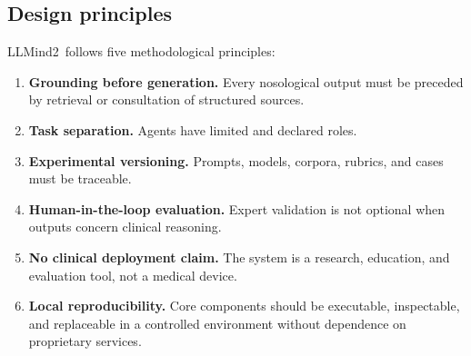 \documentclass[11pt,a4paper]{article}
\newcommand{\llmind}{LLMind2}
\begin{document}
\subsection{Design principles}
\llmind\ follows five methodological principles:
\begin{enumerate}
  \item \textbf{Grounding before generation.} Every nosological output must be preceded by retrieval or consultation of structured sources.
  \item \textbf{Task separation.} Agents have limited and declared roles.
  \item \textbf{Experimental versioning.} Prompts, models, corpora, rubrics, and cases must be traceable.
  \item \textbf{Human-in-the-loop evaluation.} Expert validation is not optional when outputs concern clinical reasoning.
  \item \textbf{No clinical deployment claim.} The system is a research, education, and evaluation tool, not a medical device.
  \item \textbf{Local reproducibility.} Core components should be executable, inspectable, and replaceable in a controlled environment without dependence on proprietary services.
\end{enumerate}
\end{document}
